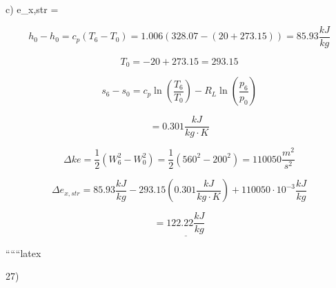 c) \quad \Delta e_{x,str} = 
\]

\[
h_0 - h_0 = c_p (T_6 - T_0) = 1.006 (328.07 - (20 + 273.15)) = 85.93 \frac{kJ}{kg}
\]

\[
T_0 = -20 + 273.15 = 293.15
\]

\[
s_6 - s_0 = c_p \ln \left( \frac{T_6}{T_0} \right) - R_L \ln \left( \frac{p_6}{p_0} \right)
\]

\[
= 0.301 \frac{kJ}{kg \cdot K}
\]

\[
\Delta ke = \frac{1}{2} (W_6^2 - W_0^2) = \frac{1}{2} (560^2 - 200^2) = 110050 \frac{m^2}{s^2}
\]

\[
\Delta e_{x,str} = 85.93 \frac{kJ}{kg} - 293.15 (0.301 \frac{kJ}{kg \cdot K}) + 110050 \cdot 10^{-3} \frac{kJ}{kg}
\]

\[
= \underline{122.22 \frac{kJ}{kg}}
\]

``````latex

27) \\